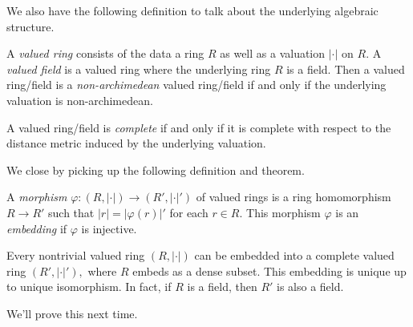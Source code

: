 \documentclass[../notes.tex]{subfiles}
\begin{document}
We also have the following definition to talk about the underlying algebraic structure.
\begin{definition}
	A \textit{valued ring} consists of the data a ring $R$ as well as a valuation $|\cdot|$ on $R.$ A \textit{valued field} is a valued ring where the underlying ring $R$ is a field. Then a valued ring/field is a \textit{non-archimedean} valued ring/field if and only if the underlying valuation is non-archimedean.
\end{definition}
\begin{definition}
	A valued ring/field is \textit{complete} if and only if it is complete with respect to the distance metric induced by the underlying valuation.
\end{definition}
We close by picking up the following definition and theorem.
\begin{definition}
	A \textit{morphism} $\varphi:(R,|\cdot|)\to(R',|\cdot|')$ of valued rings is a ring homomorphism $R\to R'$ such that $|r|=|\varphi(r)|'$ for each $r\in R.$ This morphism $\varphi$ is an \textit{embedding} if $\varphi$ is injective.
\end{definition}
\begin{theorem}
	Every nontrivial valued ring $(R,|\cdot|)$ can be embedded into a complete valued ring $(R',|\cdot|'),$ where $R$ embeds as a dense subset. This embedding is unique up to unique isomorphism. In fact, if $R$ is a field, then $R'$ is also a field.
\end{theorem}
We'll prove this next time.
\end{document}
